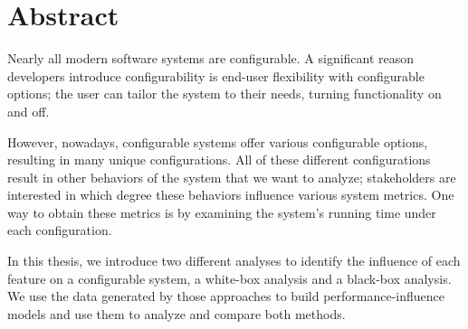 \begingroup
\let\clearpage\relax
\let\cleardoublepage\relax
\let\cleardoublepage\relax

\chapter*{Abstract}
Nearly all modern software systems are configurable. A significant reason developers introduce configurability is end-user flexibility with configurable options; 
the user can tailor the system to their needs, turning functionality on and off. 

However, nowadays, configurable systems offer various configurable options, resulting in many unique configurations. 
All of these different configurations result in other behaviors of the system that we want to analyze; stakeholders are interested in which degree 
these behaviors influence various system metrics. One way to obtain these metrics is by examining the system's running time under each configuration. 
 
In this thesis, we introduce two different analyses to identify the influence of each feature on a configurable system, a white-box analysis 
and a black-box analysis.
We use the data generated by those approaches to build performance-influence models and use them to analyze and compare both methods. 

\vfill

\endgroup

\vfill
